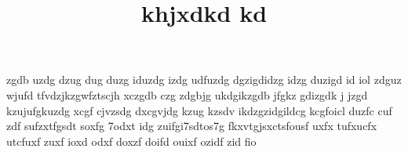 \documentclass[11pt]{scrartcl}
\begin{document}
 \title{khjxdkd kd}
 \maketitle
 
 zgdb uzdg dzug dug duzg iduzdg izdg udfuzdg dgzigdidzg idzg duzigd id iol
 zdguz wjufd tfvdzjkzgwfztscjh xczgdb czg zdgbjg ukdgikzgdb jfgkz gdizgdk j
 jzgd kzujufgkuzdg xcgf cjvzsdg dxcgvjdg kzug kzsdv ikdzgzidgildcg kcgfoicl
  duzfc cuf zdf sufzxtfgsdt soxfg 7odxt idg zuifgi7sdtos7g fkxvtgjsxctsfousf
   uxfx tufxucfx utcfuxf zuxf ioxd odxf doxzf doifd ouixf ozidf zid fio
\end{document}
